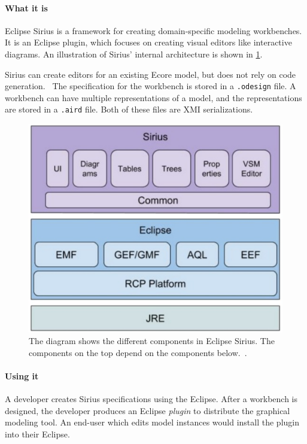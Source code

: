 \paragraph*{What it is} Eclipse Sirius is a framework for creating  domain-specific modeling workbenches.~\cite{eclipsefoundationSiriusEasiestWay}
It is an \gls{Eclipse} plugin, which focuses on creating visual editors like interactive diagrams.
An illustration of Sirius' internal architecture is shown in \cref{fig:sirius-architecture}.

Sirius can create editors for an existing \gls{Ecore} model, but does not rely on code generation.~\cite{eclipsefoundationSiriusEasiestWay}
The specification for the workbench is stored in a \texttt{.odesign} file.
A workbench can have multiple representations of a model, and the representations are stored in a \texttt{.aird} file.
Both of these files are \acrshort{XMI} serializations.

\begin{figure}[htbp]  %
  \centering
  \includegraphics[width=\textwidth]{figures/Sirius_architecture}
  \caption[The Sirius Architecture]{The diagram shows the different components in Eclipse Sirius. The components on the top depend on the components below.~\cite[p.~36]{davidSiriusCon2018Sirius2018}.}\label{fig:sirius-architecture}
\end{figure}

\paragraph*{Using it} A developer creates Sirius specifications using the \gls{Eclipse}.
After a workbench is designed, the developer produces an Eclipse \emph{plugin} to distribute the graphical modeling tool. An end-user which edits model instances would install the plugin into their \gls{Eclipse}.

